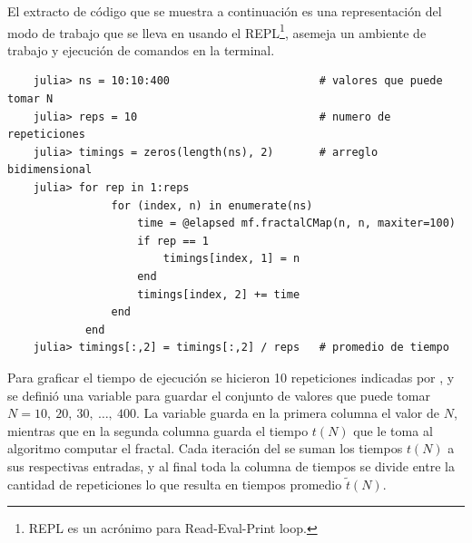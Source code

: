 El extracto de código que se muestra a continuación es una representación del modo de trabajo que se lleva en  usando el REPL\footnote{REPL es un acrónimo para Read-Eval-Print loop.}, asemeja un ambiente de trabajo y ejecución de comandos en la terminal.
\begin{listing}[ht!]
    \begin{verbatim}
    julia> ns = 10:10:400                       # valores que puede tomar N
    julia> reps = 10                            # numero de repeticiones
    julia> timings = zeros(length(ns), 2)       # arreglo bidimensional
    julia> for rep in 1:reps
                for (index, n) in enumerate(ns)
                    time = @elapsed mf.fractalCMap(n, n, maxiter=100)
                    if rep == 1
                        timings[index, 1] = n
                    end
                    timings[index, 2] += time
                end
            end
    julia> timings[:,2] = timings[:,2] / reps   # promedio de tiempo
    \end{verbatim}
\end{listing}

Para graficar el tiempo de ejecución se hicieron 10 repeticiones indicadas por , y se definió una variable  para guardar el conjunto de valores que puede tomar $N = 10,\ 20,\ 30,\ \ldots,\ 400$. La variable  guarda en la primera columna el valor de $N$, mientras que en la segunda columna guarda el tiempo $t(N)$ que le toma al algoritmo computar el fractal. Cada iteración del  se suman los tiempos $t(N)$ a sus respectivas entradas, y al final toda la columna de tiempos se divide entre la cantidad de repeticiones  lo que resulta en tiempos promedio $\tilde{t}(N)$.

